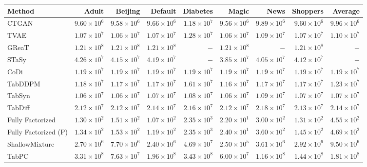 \begin{tabular}{lrrrrrrr|r}
    \toprule[0.8pt]
     \textbf{Method} & \textbf{Adult} & \textbf{Beijing} & \textbf{Default} & \textbf{Diabetes} & \textbf{Magic} & \textbf{News} & \textbf{Shoppers} & \textbf{Average} \\
    \midrule 
    CTGAN & $9.60 \times 10^{6}$ & $9.58 \times 10^{6}$ & $9.66 \times 10^{6}$ & $1.18 \times 10^{7}$ & $9.56 \times 10^{6}$ & $9.89 \times 10^{6}$ & $9.60 \times 10^{6}$ & $9.96 \times 10^{6}$ \\
    TVAE & $1.07 \times 10^{7}$ & $1.06 \times 10^{7}$ & $1.07 \times 10^{7}$ & $1.28 \times 10^{7}$ & $1.06 \times 10^{7}$ & $1.09 \times 10^{7}$ & $1.07 \times 10^{7}$ & $1.10 \times 10^{7}$ \\
    GReaT & $1.21 \times 10^{8}$ & $1.21 \times 10^{8}$ & $1.21 \times 10^{8}$ & $-$ & $1.21 \times 10^{8}$ & $-$ & $1.21 \times 10^{8}$ & $-$ \\
    STaSy & $4.26 \times 10^{7}$ & $4.15 \times 10^{7}$ & $4.19 \times 10^{7}$ & $-$ & $3.85 \times 10^{7}$ & $4.05 \times 10^{7}$ & $4.12 \times 10^{7}$ & $-$ \\
    CoDi & $1.19 \times 10^{7}$ & $1.19 \times 10^{7}$ & $1.19 \times 10^{7}$ & $1.19 \times 10^{7}$ & $1.19 \times 10^{7}$ & $1.19 \times 10^{7}$ & $1.19 \times 10^{7}$ & $1.19 \times 10^{7}$ \\
    TabDDPM & $1.18 \times 10^{7}$ & $1.17 \times 10^{7}$ & $1.17 \times 10^{7}$ & $1.61 \times 10^{7}$ & $1.16 \times 10^{7}$ & $1.17 \times 10^{7}$ & $1.17 \times 10^{7}$ & $1.23 \times 10^{7}$ \\
    TabSyn & $1.06 \times 10^{7}$ & $1.06 \times 10^{7}$ & $1.07 \times 10^{7}$ & $1.08 \times 10^{7}$ & $1.06 \times 10^{7}$ & $1.09 \times 10^{7}$ & $1.07 \times 10^{7}$ & $1.07 \times 10^{7}$ \\
    TabDiff & $2.12 \times 10^{7}$ & $2.12 \times 10^{7}$ & $2.14 \times 10^{7}$ & $2.16 \times 10^{7}$ & $2.12 \times 10^{7}$ & $2.18 \times 10^{7}$ & $2.13 \times 10^{7}$ & $2.14 \times 10^{7}$ \\
    \midrule
    Fully Factorized & $1.30 \times 10^{2}$ & $1.51 \times 10^{2}$ & $1.07 \times 10^{2}$ & $2.35 \times 10^{3}$ & $2.20 \times 10^{1}$ & $3.00 \times 10^{2}$ & $1.31 \times 10^{2}$ & $4.55 \times 10^{2}$ \\
    Fully Factorized (P) & $1.34 \times 10^{2}$ & $1.53 \times 10^{2}$ & $1.19 \times 10^{2}$ & $2.35 \times 10^{3}$ & $2.40 \times 10^{1}$ & $3.60 \times 10^{2}$ & $1.45 \times 10^{2}$ & $4.69 \times 10^{2}$ \\
    ShallowMixture & $2.70 \times 10^{6}$ & $7.70 \times 10^{6}$ & $2.40 \times 10^{6}$ & $4.69 \times 10^{7}$ & $2.50 \times 10^{5}$ & $3.61 \times 10^{6}$ & $2.92 \times 10^{6}$ & $9.50 \times 10^{6}$ \\
    TabPC & $3.31 \times 10^{8}$ & $7.63 \times 10^{7}$ & $1.96 \times 10^{8}$ & $3.43 \times 10^{8}$ & $6.00 \times 10^{7}$ & $1.16 \times 10^{8}$ & $1.44 \times 10^{8}$ & $1.81 \times 10^{8}$ \\
    \bottomrule[1.0pt]
\end{tabular}